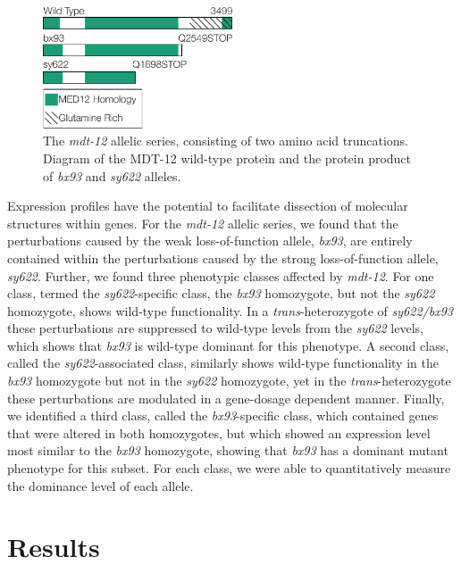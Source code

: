 \documentclass[10pt, twocolumn]{article}
\newcommand{\gene}[1]{\mbox{\emph{#1}}}
\newcommand{\protein}[1]{\mbox{\uppercase{#1}}}
\newcommand{\dpy}{\gene{mdt-12}}
\begin{document}
\begin{figure}
  \centering{}
  \includegraphics[width=0.5\textwidth]{../figs/gene_model_dpy22.pdf}
  \caption{
    The \dpy{} allelic series, consisting of two amino acid truncations. Diagram
    of the \protein{mdt-12} wild-type protein and the protein product of
    \emph{bx93} and \emph{sy622} alleles.
    }
\label{fig:dpy22}
\end{figure}

Expression profiles have the potential to facilitate dissection of molecular
structures within genes. For the \dpy{} allelic series, we found that the
perturbations caused by the weak loss-of-function allele, \emph{bx93}, are
entirely contained within the perturbations caused by the strong
loss-of-function allele, \emph{sy622}. Further, we found three phenotypic
classes affected by \dpy{}. For one class, termed the \emph{sy622}-specific
class, the \emph{bx93} homozygote, but not the \emph{sy622} homozygote, shows
wild-type functionality. In a \emph{trans}-heterozygote of \emph{sy622/bx93}
these perturbations are suppressed to wild-type levels from the \emph{sy622}
levels, which shows that \emph{bx93} is wild-type dominant for this phenotype. A
second class, called the \emph{sy622}-associated class, similarly shows
wild-type functionality in the \emph{bx93} homozygote but not in the
\emph{sy622} homozygote, yet in the \emph{trans}-heterozygote these
perturbations are modulated in a gene-dosage dependent manner. Finally, we
identified a third class, called the \emph{bx93}-specific class, which contained
genes that were altered in both homozygotes, but which showed an expression
level most similar to the \emph{bx93} homozygote, showing that \emph{bx93} has a
dominant mutant phenotype for this subset. For each class, we were able to
quantitatively measure the dominance level of each allele.


\section*{Results}
\end{document}
